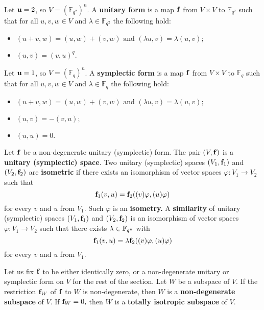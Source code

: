 Let ${\bf u}=2$, so $V=(\mathbb{F}_{q^2})^n$. A {\bf unitary form}  is a map ${\bf f}$ from $V \times V$ to $\mathbb{F}_{q^{2}}$ such that for all $u,v,w \in V$ and $\lambda \in \mathbb{F}_{q^{2}}$ the following hold:
\begin{itemize}
\item 
$(u+v,w)=(u,w)+(v,w) \text{ and } (\lambda u, v)=\lambda(u,v);$
\item $(u,v)=(v,u)^q$. 
\end{itemize}


Let ${\bf u}=1$, so $V=(\mathbb{F}_{q})^n$.  A {\bf symplectic form}  is a map ${\bf f}$ from $V \times V$ to $\mathbb{F}_{q}$ such that for all $u,v,w \in V$ and $\lambda \in \mathbb{F}_{q}$ the following hold:
\begin{itemize}
\item 
$(u+v,w)=(u,w)+(v,w) \text{ and } (\lambda u, v)=\lambda(u,v);$
\item $(u,v)=-(v,u)$;
\item $(u,u)=0.$ 
\end{itemize}

Let ${\bf f}$ be a non-degenerate unitary (symplectic) form. The pair $(V,{\bf f})$ is a {\bf unitary (symplectic) space}. %
 Two unitary (symplectic) spaces $(V_1, {\bf f}_1)$ and  $(V_2, {\bf f}_2)$ are {\bf isometric} if there exists an isomorphism of vector spaces $\varphi: V_1 \to V_2$ such that $${\bf f}_1(v,u)={\bf f}_2((v)\varphi,(u)\varphi)$$
for every $v$ and $u$ from $V_1$. Such $\varphi$ is an {\bf isometry.}  A {\bf similarity}  of unitary (symplectic) spaces $(V_1, {\bf f}_1)$ and  $(V_2, {\bf f}_2)$ is an isomorphism of vector spaces $\varphi: V_1 \to V_2$ such that there exists $\lambda \in \mathbb{F}_{q^{\bf u}}$ with 
\begin{equation}
\label{simillambda}
{\bf f}_1(v,u)=\lambda{\bf f}_2((v)\varphi,(u)\varphi)
\end{equation}
for every $v$ and $u$ from $V_1$. 

Let us fix ${\bf f}$ to be either  identically zero, or a non-degenerate unitary or symplectic form on $V$ for the rest of the section. Let $W$ be a subspace of $V$. If the restriction ${\bf f}_{W}$ of ${\bf f}$ to $W$ is non-degenerate, then $W$ is a {\bf non-degenerate subspace}  of $V$. If ${\bf f}_{W}=0,$ then $W$ is a {\bf totally isotropic subspace}  of $V.$ 

